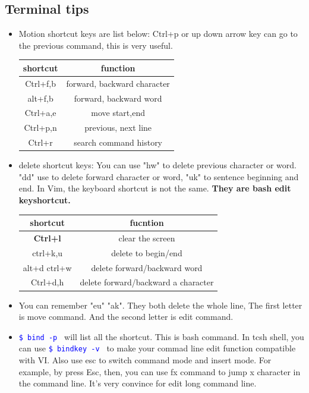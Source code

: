 \documentclass[a4paper,12pt,twoside]{book}
\newcommand{\linuxcommand}[1]{\texttt{\textcolor{blue}{\$ #1 \Pisymbol{psy}{191}}}}
\begin{document}
\subsection{Terminal tips}

\begin{itemize}

		\item Motion shortcut keys are list below: Ctrl+p or up down arrow key can go to the previous command, this is very useful. 
\begin{center}
  \begin{tabular}{c|c}
 \hline shortcut & function \\
\hline Ctrl+f,b & forward, backward character \\
\hline alt+f,b & forward, backward word \\
\hline Ctrl+a,e & move start,end \\
\hline Ctrl+p,n & previous, next line \\
\hline Ctrl+r & search command history \\
 \hline
  \end{tabular}
\end{center}

		\item delete shortcut keys: You can use "hw" to delete previous character or word. "dd" use to delete forward character or word, "uk" to sentence beginning and end. In Vim, the keyboard shortcut is not the same. \textbf{They are bash edit keyshortcut.}

\begin{center}
  \begin{tabular}{|c|c|}
 \hline shortcut & fucntion \\
 \hline \textbf{Ctrl+l} & clear the screen \\	
\hline ctrl+k,u & delete to begin/end \\
\hline alt+d ctrl+w & delete forward/backward word \\
\hline Ctrl+d,h  & delete forward/backward a character  \\
 \hline
  \end{tabular}
\end{center}

		\item You can remember "eu" "ak". They both delete the whole line, The first letter is move command. And the second letter is edit command. 

		\item \linuxcommand{bind -p} will list all the shortcut. This is bash command. In tcsh shell, you can use \linuxcommand{bindkey -v} to make your commad line edit function compatible with VI. Also use esc to switch command mode and insert mode. For example, by press Esc, then, you can use fx command to jump x character in the command line. It's very convince for edit long command line.


\end{itemize}
\end{document}
